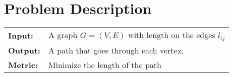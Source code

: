 \documentclass{article}
\begin{document}
\section{Problem Description}
\begin{tabular}{l p{10cm}}
  \textbf{Input:} & A graph $G = (V, E)$ with length on the edges $l_{ij}$ \\
  \textbf{Output:} & A path that goes through each vertex.\\
  \textbf{Metric:} & Minimize the length of the path\\
\end{tabular}
\end{document}
